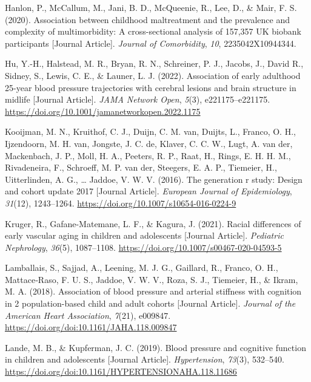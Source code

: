 \documentclass[
  letterpaper,
  DIV=11,
  numbers=noendperiod]{scrreport}
\newlength{\cslhangindent}
\newenvironment{CSLReferences}[2] %
 {\begin{list}{}{%
  \setlength{\itemindent}{0pt}
  \setlength{\leftmargin}{0pt}
  \setlength{\parsep}{0pt}
  \ifodd #1
   \setlength{\leftmargin}{\cslhangindent}
   \setlength{\itemindent}{-1\cslhangindent}
  \fi
  \setlength{\itemsep}{#2\baselineskip}}}
 {\end{list}}
\begin{document}
\begin{CSLReferences}{1}{0}
Hanlon, P., McCallum, M., Jani, B. D., McQueenie, R., Lee, D., \& Mair,
F. S. (2020). Association between childhood maltreatment and the
prevalence and complexity of multimorbidity: A cross-sectional analysis
of 157,357 UK biobank participants {[}Journal Article{]}. \emph{Journal
of Comorbidity}, \emph{10}, 2235042X10944344.

Hu, Y.-H., Halstead, M. R., Bryan, R. N., Schreiner, P. J., Jacobs, J.,
David R., Sidney, S., Lewis, C. E., \& Launer, L. J. (2022). Association
of early adulthood 25-year blood pressure trajectories with cerebral
lesions and brain structure in midlife {[}Journal Article{]}. \emph{JAMA
Network Open}, \emph{5}(3), e221175--e221175.
\url{https://doi.org/10.1001/jamanetworkopen.2022.1175}

Kooijman, M. N., Kruithof, C. J., Duijn, C. M. van, Duijts, L., Franco,
O. H., Ijzendoorn, M. H. van, Jongste, J. C. de, Klaver, C. C. W., Lugt,
A. van der, Mackenbach, J. P., Moll, H. A., Peeters, R. P., Raat, H.,
Rings, E. H. H. M., Rivadeneira, F., Schroeff, M. P. van der, Steegers,
E. A. P., Tiemeier, H., Uitterlinden, A. G., \ldots{} Jaddoe, V. W. V.
(2016). The generation r study: Design and cohort update 2017 {[}Journal
Article{]}. \emph{European Journal of Epidemiology}, \emph{31}(12),
1243--1264. \url{https://doi.org/10.1007/s10654-016-0224-9}

Kruger, R., Gafane-Matemane, L. F., \& Kagura, J. (2021). Racial
differences of early vascular aging in children and adolescents
{[}Journal Article{]}. \emph{Pediatric Nephrology}, \emph{36}(5),
1087--1108. \url{https://doi.org/10.1007/s00467-020-04593-5}

Lamballais, S., Sajjad, A., Leening, M. J. G., Gaillard, R., Franco, O.
H., Mattace‐Raso, F. U. S., Jaddoe, V. W. V., Roza, S. J., Tiemeier, H.,
\& Ikram, M. A. (2018). Association of blood pressure and arterial
stiffness with cognition in 2 population-based child and adult cohorts
{[}Journal Article{]}. \emph{Journal of the American Heart Association},
\emph{7}(21), e009847. \url{https://doi.org/doi:10.1161/JAHA.118.009847}

Lande, M. B., \& Kupferman, J. C. (2019). Blood pressure and cognitive
function in children and adolescents {[}Journal Article{]}.
\emph{Hypertension}, \emph{73}(3), 532--540.
\url{https://doi.org/doi:10.1161/HYPERTENSIONAHA.118.11686}


\end{CSLReferences}
\end{document}

